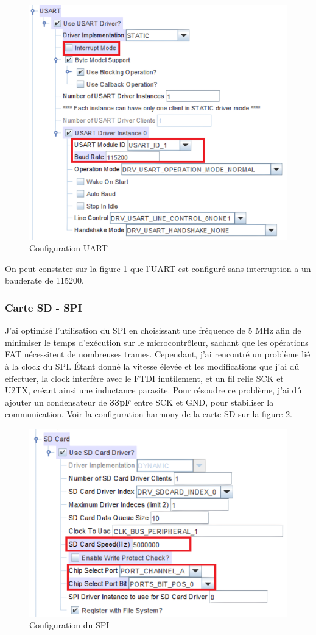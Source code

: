 {	\begin{figure}[h]
		\centering
		\includegraphics[width=0.7\linewidth]{Figures/Dev-SOFT/ConfigUart}
		\caption{Configuration UART}
		\label{fig:configuart}
	\end{figure}
	
	
	On peut constater sur la figure \ref{fig:configuart} que l'UART est configuré sans interruption a un bauderate de 115200.

	\subsubsection{Carte SD - SPI} 
	{
	J'ai optimisé l'utilisation du SPI en choisissant une fréquence de 5 MHz afin de minimiser le temps d'exécution sur le microcontrôleur, sachant que les opérations FAT nécessitent de nombreuses trames. Cependant, j'ai rencontré un problème lié à la clock du SPI. Étant donné la vitesse élevée et les modifications que j'ai dû effectuer, la clock interfère avec le FTDI inutilement, et un fil relie SCK et U2TX, créant ainsi une inductance parasite. Pour résoudre ce problème, j'ai dû ajouter un condensateur de \textbf{33pF} entre SCK et GND, pour stabiliser la communication. Voir la configuration harmony de la carte SD sur la figure \ref{fig:configsdspi}.
	\clearpage
	\begin{figure}[h]
		\centering
		\includegraphics[width=0.7\linewidth]{Figures/Dev-SOFT/ConfigSD_SPI}
		\caption{Configuration du SPI}
		\label{fig:configsdspi}
	\end{figure}
	}

}

